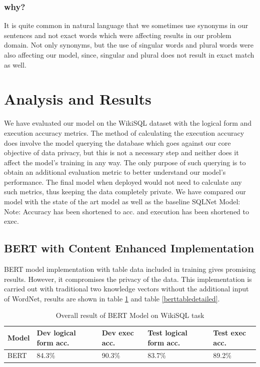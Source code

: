 \documentclass[12pt]{article}
\begin{document}
\subsubsection{why?}
It is quite common in natural language that we sometimes use synonyms in our sentences and not exact words which were affecting results in our problem domain. Not only synonyms, but the use of singular words and plural words were also affecting our model, since, singular and plural does not result in exact match as well. 

\section{Analysis and Results}


We have evaluated our model on the WikiSQL dataset with
the logical form and execution accuracy metrics. The method
of calculating the execution accuracy does involve the model
querying the database which goes against our core objective of
data privacy, but this is not a necessary step and neither does
it affect the model’s training in any way. The only purpose of
such querying is to obtain an additional evaluation metric to
better understand our model’s performance. The final model
when deployed would not need to calculate any such metrics,
thus keeping the data completely private.
We have compared our model with the state of the art model
as well as the baseline SQLNet Model:
Note: Accuracy has been shortened to acc. and execution
has been shortened to exec.

\subsection{BERT with Content Enhanced Implementation}

BERT model implementation with table data included in training gives promising results. However, it compromises the privacy of the data. This implementation is carried out with traditional two knowledge vectors without the additional input of WordNet, results are shown in table \ref{berttable} and table \ref{berttabledetailed}.


 \begin{table}
\centering
 \begin{tabular}{| m{2cm} | m{2cm}| m{2cm} |m{2cm}| m{2cm} |} 
 \hline
Model & Dev logical form acc. & Dev exec acc. & Test logical form acc. & Test exec acc. \\ 
 \hline\hline
  BERT & 84.3\% & 90.3\% & 83.7\% & 89.2\% \\ 
 \hline
\end{tabular}
\caption{Overall result of BERT Model on WikiSQL task}
\label{berttable}
\end{table}
\end{document}
